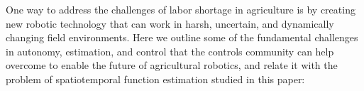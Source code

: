 

One way to address the challenges of labor shortage in agriculture is by creating new robotic technology that can work in harsh, uncertain, and dynamically changing field environments. %
Here we outline some of the fundamental challenges in autonomy, estimation, and control that the controls community can help overcome to enable the future of agricultural robotics, and relate it with the problem of spatiotemporal function estimation studied in this paper:

